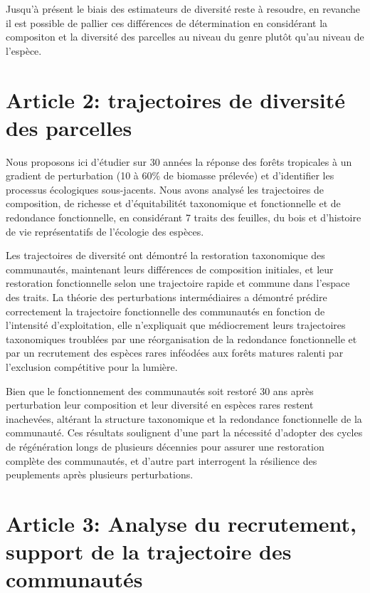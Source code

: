 \documentclass[11pt,french,A4paper,extrafontsizes,onecolumn,openright]{memoir}
\begin{document}
Jusqu'à présent le biais des estimateurs de diversité reste à resoudre,
en revanche il est possible de pallier ces différences de détermination
en considérant la compositon et la diversité des parcelles au niveau du
genre plutôt qu'au niveau de l'espèce.

\chapter{Article 2: trajectoires de diversité des
parcelles}\label{article-2-trajectoires-de-diversite-des-parcelles}

Nous proposons ici d'étudier sur 30 années la réponse des forêts
tropicales à un gradient de perturbation (10 à 60\% de biomasse
prélevée) et d'identifier les processus écologiques sous-jacents. Nous
avons analysé les trajectoires de composition, de richesse et
d'équitabilitét taxonomique et fonctionnelle et de redondance
fonctionnelle, en considérant 7 traits des feuilles, du bois et
d'histoire de vie représentatifs de l'écologie des espèces.

Les trajectoires de diversité ont démontré la restoration taxonomique
des communautés, maintenant leurs différences de composition initiales,
et leur restoration fonctionnelle selon une trajectoire rapide et
commune dans l'espace des traits. La théorie des perturbations
intermédiaires a démontré prédire correctement la trajectoire
fonctionnelle des communautés en fonction de l'intensité d'exploitation,
elle n'expliquait que médiocrement leurs trajectoires taxonomiques
troublées par une réorganisation de la redondance fonctionnelle et par
un recrutement des espèces rares inféodées aux forêts matures ralenti
par l'exclusion compétitive pour la lumière.

Bien que le fonctionnement des communautés soit restoré 30 ans après
perturbation leur composition et leur diversité en espèces rares restent
inachevées, altérant la structure taxonomique et la redondance
fonctionnelle de la communauté. Ces résultats soulignent d'une part la
nécessité d'adopter des cycles de régénération longs de plusieurs
décennies pour assurer une restoration complète des communautés, et
d'autre part interrogent la résilience des peuplements après plusieurs
perturbations.

\chapter{Article 3: Analyse du recrutement, support de la trajectoire
des
communautés}\label{article-3-analyse-du-recrutement-support-de-la-trajectoire-des-communautes}
\end{document}
